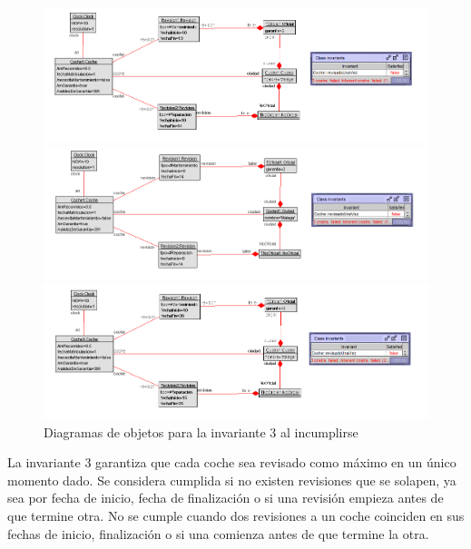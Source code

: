 \documentclass[12pt.a4paper]{article}
\begin{document}
    
   \begin{figure}[H]
    \centering
    \begin{minipage}{0.49\textwidth}
        \centering
        \includegraphics[width=\linewidth]{Soils/3_v2.png}
    \end{minipage}
    \hfill
    \begin{minipage}{0.49\textwidth}
        \centering
        \includegraphics[width=\linewidth]{Soils/3_v3.png}
    \end{minipage}
    \hfill
        \centering
        \includegraphics[width=0.7\linewidth]{Soils/3_v4.png}
    \caption{Diagramas de objetos para la invariante 3 al incumplirse}
\end{figure}


La invariante 3 garantiza que cada coche sea revisado como máximo en un único momento dado. Se considera cumplida si no existen revisiones que se solapen, ya sea por fecha de inicio, fecha de finalización o si una revisión empieza antes de que termine otra. No se cumple cuando dos revisiones a un coche coinciden en sus fechas de inicio, finalización o si una comienza antes de que termine la otra.
\end{document}
